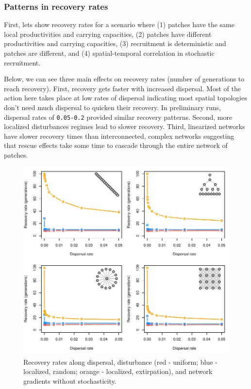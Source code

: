 \documentclass[
]{article}
\begin{document}
\newpage

\hypertarget{patterns-in-recovery-rates}{%
\subsubsection{Patterns in recovery
rates}\label{patterns-in-recovery-rates}}

First, lets show recovery rates for a scenario where (1) patches have
the same local productivities and carrying capacities, (2) patches have
different productivities and carrying capacities, (3) recruitment is
deterministic and patches are different, and (4) spatial-temporal
correlation in stochastic recruitment.

Below, we can see three main effects on recovery rates (number of
generations to reach recovery). First, recovery gets faster with
increased dispersal. Most of the action here takes place at low rates of
dispersal indicating most spatial topologies don't need much dispersal
to quicken their recovery. In preliminary runs, dispersal rates of
\texttt{0.05-0.2} provided similar recovery patterns. Second, more
localized disturbances regimes lead to slower recovery. Third,
linearized networks have slower recovery times than interconnected,
complex networks suggesting that rescue effects take some time to
cascade through the entire network of patches.

\begin{figure}[H]

{\centering \includegraphics{Managing_for_ecological_surprises_in_metapopulations_files/figure-latex/general results-1} 

}

\caption{Recovery rates along dispersal, disturbance (red - uniform; blue - localized, random; orange - localized, extirpation), and network gradients without stochasticity.}\label{fig:general results}
\end{figure}
\newpage
\end{document}
